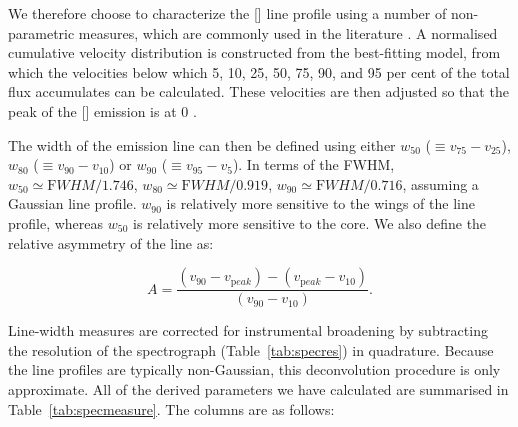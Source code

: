 We therefore choose to characterize the [] line profile using a number of non-parametric measures, which are commonly used in the literature \citep[e.g.][]{zakamska14,zakamska16}. 
A normalised cumulative velocity distribution is constructed from the best-fitting model, from which the velocities below which 5, 10, 25, 50, 75, 90, and 95 per cent of the total flux accumulates can be calculated. 
These velocities are then adjusted so that the peak of the [] emission is at 0 \kms. 

The width of the emission line can then be defined using either $w_{50}$ ($\equiv v_{75} - v_{25}$), $w_{80}$ ($\equiv v_{90} - v_{10}$) or $w_{90}$ ($\equiv v_{95} - v_{5}$). 
In terms of the FWHM, $w_{50} \simeq {\mathrm FWHM} / 1.746$, $w_{80} \simeq {\mathrm FWHM} / 0.919$, $w_{90} \simeq {\mathrm FWHM} / 0.716$, assuming a Gaussian line profile.  
$w_{90}$ is relatively more sensitive to the wings of the line profile, whereas $w_{50}$ is relatively more sensitive to the core.
We also define the relative asymmetry of the line as:

\begin{equation}
  A = \frac{(v_{90} - v_{\mathrm peak}) - (v_{\mathrm peak} - v_{10})}{(v_{90} - v_{10})}.     
\end{equation} 

Line-width measures are corrected for instrumental broadening  by subtracting the resolution of the spectrograph (Table~\ref{tab:specres}) in quadrature.
Because the line profiles are typically non-Gaussian, this deconvolution procedure is only approximate. 
All of the derived parameters we have calculated are summarised in Table~\ref{tab:specmeasure}. 
The columns are as follows: 

